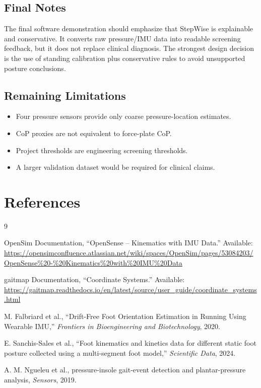 \documentclass[11pt]{article}
\begin{document}
{\subsection*{Final Notes}
The final software demonstration should emphasize that StepWise is explainable and conservative. It converts raw pressure/IMU data into readable screening feedback, but it does not replace clinical diagnosis. The strongest design decision is the use of standing calibration plus conservative rules to avoid unsupported posture conclusions.

\subsection*{Remaining Limitations}
\begin{itemize}[leftmargin=*]
    \item Four pressure sensors provide only coarse pressure-location estimates.
    \item CoP proxies are not equivalent to force-plate CoP.
    \item Project thresholds are engineering screening thresholds.
    \item A larger validation dataset would be required for clinical claims.
\end{itemize}
}

\clearpage
\section*{References}
\begin{thebibliography}{9}

OpenSim Documentation, ``OpenSense -- Kinematics with IMU Data.'' Available: \url{https://opensimconfluence.atlassian.net/wiki/spaces/OpenSim/pages/53084203/OpenSense%20-%20Kinematics%20with%20IMU%20Data}

gaitmap Documentation, ``Coordinate Systems.'' Available: \url{https://gaitmap.readthedocs.io/en/latest/source/user_guide/coordinate_systems.html}

M. Falbriard et al., ``Drift-Free Foot Orientation Estimation in Running Using Wearable IMU,'' \textit{Frontiers in Bioengineering and Biotechnology}, 2020.

E. Sanchis-Sales et al., ``Foot kinematics and kinetics data for different static foot posture collected using a multi-segment foot model,'' \textit{Scientific Data}, 2024.

A. M. Ngueleu et al., pressure-insole gait-event detection and plantar-pressure analysis, \textit{Sensors}, 2019.

\end{thebibliography}
\end{document}
